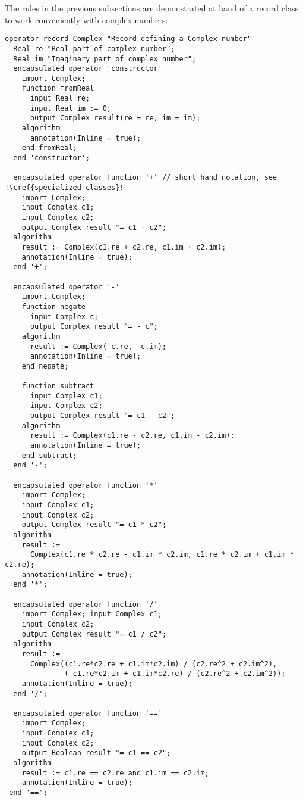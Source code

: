 \begin{example}
The rules in the previous subsections are demonstrated at hand of a record class to work conveniently with complex numbers:
\begin{lstlisting}[language=modelica,escapechar=!]
operator record Complex "Record defining a Complex number"
  Real re "Real part of complex number";
  Real im "Imaginary part of complex number";
  encapsulated operator 'constructor'
    import Complex;
    function fromReal
      input Real re;
      input Real im := 0;
      output Complex result(re = re, im = im);
    algorithm
      annotation(Inline = true);
    end fromReal;
  end 'constructor';

  encapsulated operator function '+' // short hand notation, see !\cref{specialized-classes}!
    import Complex;
    input Complex c1;
    input Complex c2;
    output Complex result "= c1 + c2";
  algorithm
    result := Complex(c1.re + c2.re, c1.im + c2.im);
    annotation(Inline = true);
  end '+';

  encapsulated operator '-'
    import Complex;
    function negate
      input Complex c;
      output Complex result "= - c";
    algorithm
      result := Complex(-c.re, -c.im);
      annotation(Inline = true);
    end negate;

    function subtract
      input Complex c1;
      input Complex c2;
      output Complex result "= c1 - c2";
    algorithm
      result := Complex(c1.re - c2.re, c1.im - c2.im);
      annotation(Inline = true);
    end subtract;
  end '-';

  encapsulated operator function '*'
    import Complex;
    input Complex c1;
    input Complex c2;
    output Complex result "= c1 * c2";
  algorithm
    result :=
      Complex(c1.re * c2.re - c1.im * c2.im, c1.re * c2.im + c1.im * c2.re);
    annotation(Inline = true);
  end '*';

  encapsulated operator function '/'
    import Complex; input Complex c1;
    input Complex c2;
    output Complex result "= c1 / c2";
  algorithm
    result :=
      Complex((c1.re*c2.re + c1.im*c2.im) / (c2.re^2 + c2.im^2),
              (-c1.re*c2.im + c1.im*c2.re) / (c2.re^2 + c2.im^2));
    annotation(Inline = true);
  end '/';

  encapsulated operator function '=='
    import Complex;
    input Complex c1;
    input Complex c2;
    output Boolean result "= c1 == c2";
  algorithm
    result := c1.re == c2.re and c1.im == c2.im;
    annotation(Inline = true);
 end '==';


\end{lstlisting}
\end{example}
